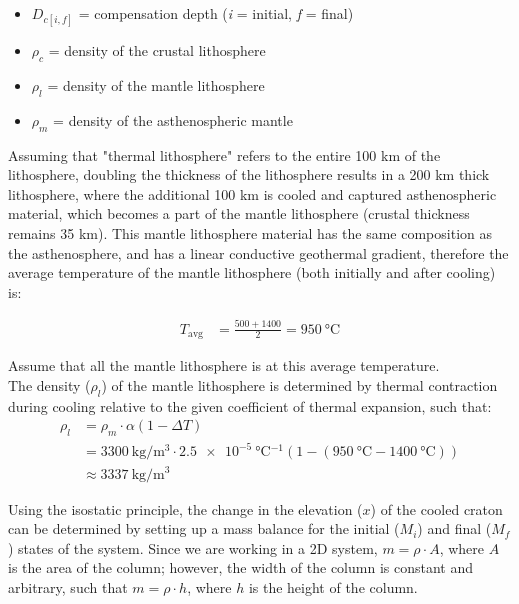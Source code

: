 \documentclass{template}
\begin{document}
\begin{enumerate}[label=\textbf{\arabic*.}]
\begin{enumerate}[label=\Alph*)]
{        \begin{itemize}
            \item $D_{c[i,f]}$ = compensation depth (\textit{i} = initial, \textit{f} = final)
            \item $\rho_c$ = density of the crustal lithosphere
            \item $\rho_l$ = density of the mantle lithosphere
            \item $\rho_m$ = density of the asthenospheric mantle\\
        \end{itemize}

        Assuming that "thermal lithosphere" refers to the entire 100 km of the lithosphere, doubling the thickness of the lithosphere results in a 200 km thick lithosphere, where the additional 100 km is cooled and captured asthenospheric material, which becomes a part of the mantle lithosphere (crustal thickness remains 35 km). This mantle lithosphere material has the same composition as the asthenosphere, and has a linear conductive geothermal gradient, therefore the average temperature of the mantle lithosphere (both initially and after cooling) is:

        \begin{align*}
            T_{\text{avg}} &= \frac{500+1400}{2} = \qty{950}{\celsius}
        \end{align*}

        Assume that all the mantle lithosphere is at this average temperature.\\

        The density ($\rho_l$) of the mantle lithosphere is determined by thermal contraction during cooling relative to the given coefficient of thermal expansion, such that:
        \begin{align*}
            \rho_l &= \rho_m \cdot \alpha (1 - \Delta T)\\
            &= \qty{3300}{\kg\per\m\cubed} \cdot \qty{2.5e-5}{\celsius^{-1}} (1 - (\qty{950}{\celsius} - \qty{1400}{\celsius}))\\
            &\approx \qty{3337}{\kg\per\m\cubed}
        \end{align*}

        Using the isostatic principle, the change in the elevation ($x$) of the cooled craton can be determined by setting up a mass balance for the initial ($M_i$) and final ($M_f$) states of the system. Since we are working in a 2D system, $m = \rho \cdot A$, where $A$ is the area of the column; however, the width of the column is constant and arbitrary, such that $m = \rho \cdot h$, where $h$ is the height of the column.\\

}
\end{enumerate}
\end{enumerate}
\end{document}
